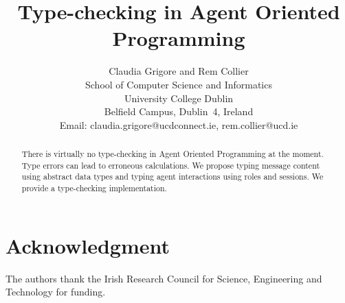 \documentclass{article} %
\title{Type-checking in Agent Oriented Programming}
\author{
   Claudia Grigore and Rem Collier\\ 
   School of Computer Science and Informatics\\
    University College Dublin\\
    Belfield Campus, Dublin~4, Ireland\\
    Email: claudia.grigore@ucdconnect.ie, rem.collier@ucd.ie}
\begin{document}
\maketitle
\begin{abstract} %
There is virtually no type-checking in Agent Oriented Programming at the moment. Type errors can lead to erroneous calculations. We propose typing message content using abstract data types and typing agent interactions using roles and sessions. We provide a type-checking implementation.

\end{abstract} %
\section*{Acknowledgment}

The authors thank the Irish Research Council for Science, Engineering and
Technology for funding.




\end{document}
